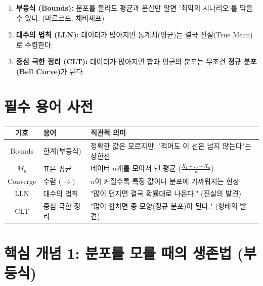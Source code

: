 \documentclass[11pt,a4paper]{book}
\theoremstyle{definition}
\begin{document}
\begin{tcolorbox}[colback=subgray, title={\textbf{📌 이 단원의 핵심 개요 (Overview)}}]
\begin{enumerate}
    \item \textbf{부등식 (Bounds):} 분포를 몰라도 평균과 분산만 알면 '최악의 시나리오'를 막을 수 있다. (마르코프, 체비셰프)
    \item \textbf{대수의 법칙 (LLN):} 데이터가 많아지면 통계치(평균)는 결국 진실(True Mean)로 수렴한다.
    \item \textbf{중심 극한 정리 (CLT):} 데이터가 많아지면 합과 평균의 분포는 무조건 \textbf{정규 분포(Bell Curve)}가 된다.
\end{enumerate}
\end{tcolorbox}

\section{필수 용어 사전}

\begin{center}
\begin{tabular}{|c|l|l|}
\hline
\rowcolor{mainblue!20} \textbf{기호} & \textbf{용어} & \textbf{직관적 의미} \\ \hline
Bounds & 한계(부등식) & 정확한 값은 모르지만, "적어도 이 선은 넘지 않는다"는 상한선 \\ \hline
$M_n$ & 표본 평균 & 데이터 $n$개를 모아서 낸 평균 ($\frac{X_1+\dots+X_n}{n}$) \\ \hline
Converge & 수렴 ($\to$) & $n$이 커질수록 특정 값이나 분포에 가까워지는 현상 \\ \hline
LLN & 대수의 법칙 & "많이 던지면 결국 확률대로 나온다." (진실의 발견) \\ \hline
CLT & 중심 극한 정리 & "많이 합치면 종 모양(정규 분포)이 된다." (형태의 발견) \\ \hline
\end{tabular}
\end{center}

\section{핵심 개념 1: 분포를 모를 때의 생존법 (부등식)}
\end{document}
